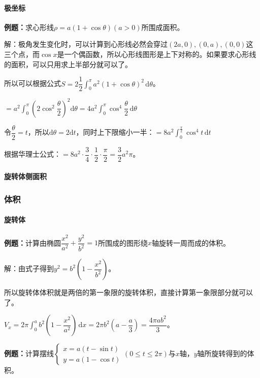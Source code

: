\documentclass[UTF8, 12pt]{ctexart}
\begin{document}
\paragraph{极坐标} \leavevmode \medskip

\textbf{例题：}求心形线$\rho=a(1+\cos\theta)(a>0)$所围成面积。

解：极角发生变化时，可以计算到心形线必然会穿过$(2a,0),(0,a),(0,0)$这三个点，而$\cos x$是一个偶函数，所以心形线图形是上下对称的。如果要求心形线的面积，可以只用求上半部分就可以了。

所以可以根据公式$S=2\dfrac{1}{2}\int_0^\pi a^2(1+\cos\theta)^2\,\textrm{d}\theta$。

$=a^2\displaystyle{\int_0^\pi\left(2\cos^2\dfrac{\theta}{2}\right)^2\textrm{d}\theta}=4a^2\displaystyle{\int_0^\pi\cos^4\dfrac{\theta}{2}\,\textrm{d}\theta}$

令$\dfrac{\theta}{2}=t$，所以$\textrm{d}\theta=2\textrm{d}t$，同时上下限缩小一半：$=8a^2\int_0^{\frac{\pi}{2}}\cos^4t\,\textrm{d}t$

根据华理士公式：$=8a^2\cdot\dfrac{3}{4}\cdot\dfrac{1}{2}\cdot\dfrac{\pi}{2}=\dfrac{3}{2}a^2\pi$。

\paragraph{旋转体侧面积} \leavevmode \medskip

\subsubsection{体积}

\paragraph{旋转体} \leavevmode \medskip

\textbf{例题：}计算由椭圆$\dfrac{x^2}{a^2}+\dfrac{y^2}{b^2}=1$所围成的图形绕$x$轴旋转一周而成的体积。

解：由式子得到$y^2=b^2\left(1-\dfrac{x^2}{b^2}\right)$。

所以旋转体体积就是两倍的第一象限的旋转体积，直接计算第一象限部分就可以了。

$V_x=2\pi\displaystyle{\int_0^ab^2\left(1-\dfrac{x^2}{a^2}\right)\,\textrm{d}x}=2\pi b^2\left(a-\dfrac{a}{3}\right)=\dfrac{4\pi ab^2}{3}$。

\textbf{例题：}计算摆线$\left\{\begin{array}{l}
    x=a(t-\sin t) \\
    y=a(1-\cos t)
\end{array}
\right.$$(0\leqslant t\leqslant 2\pi)$与$x$轴，$y$轴所旋转得到的体积。
\end{document}
